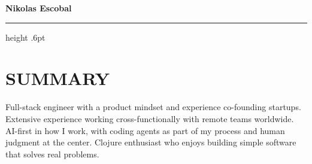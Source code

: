 \documentclass[11pt,letterpaper]{article}
\begin{document}
\begin{center}
{\fontsize{22}{25}\selectfont\bfseries Nikolas Escobal}\par
{}\par
{}
\end{center}
\vspace{-7pt}\hrule height .6pt
\section{SUMMARY}
Full-stack engineer with a product mindset and experience co-founding startups. Extensive experience working cross-functionally with remote teams worldwide. AI-first in how I work, with coding agents as part of my process and human judgment at the center. Clojure enthusiast who enjoys building simple software that solves real problems.
\end{document}
